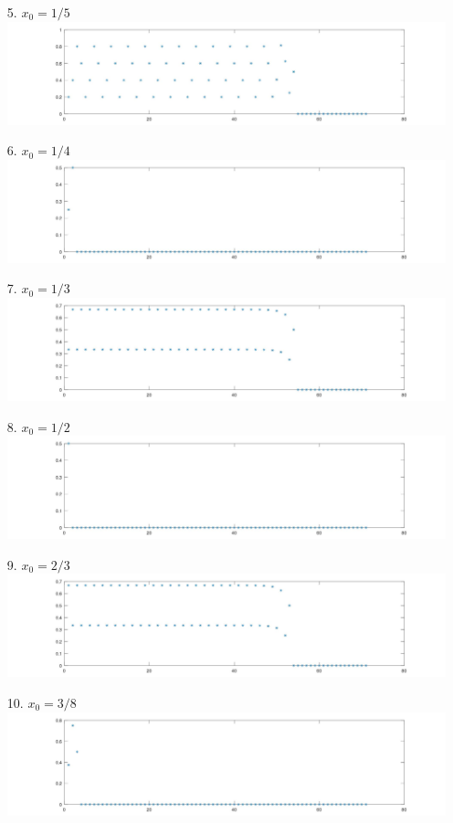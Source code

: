 \documentclass{article}
\begin{document}
\begin{itemize}
	\item[5.] $x_0 = 1/5$ \\
		\includegraphics[scale = 0.2]{Fig1.3.6.5.jpg}	
	\item[6.] $x_0 = 1/4$ \\
		\includegraphics[scale = 0.2]{Fig1.3.6.6.jpg}
	\item[7.] $x_0 = 1/3$ \\
		\includegraphics[scale = 0.2]{Fig1.3.6.7.jpg}
	\item[8.] $x_0 = 1/2$ \\
		\includegraphics[scale = 0.2]{Fig1.3.6.8.jpg}	
	\item[9.] $x_0 = 2/3$ \\
		\includegraphics[scale = 0.2]{Fig1.3.6.9.jpg}	
	\item[10.] $x_0 = 3/8$ \\
		\includegraphics[scale = 0.2]{Fig1.3.6.10.jpg}	
\end{itemize}
\end{document}
